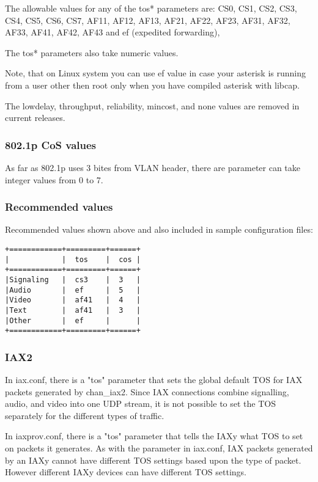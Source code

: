 The allowable values for any of the tos* parameters are: 
CS0, CS1, CS2, CS3, CS4, CS5, CS6, CS7, AF11, AF12, AF13, AF21, AF22, AF23, 
AF31, AF32, AF33, AF41, AF42, AF43 and ef (expedited forwarding),

The tos* parameters also take numeric values.

Note, that on Linux system you can use ef value in case your asterisk is running
from a user other then root only when you have compiled asterisk with libcap.

The lowdelay, throughput, reliability, mincost, and none values are removed
in current releases.

\subsubsection{802.1p CoS values}

As far as 802.1p uses 3 bites from VLAN header, there are parameter can take
integer values from 0 to 7.

\subsubsection{Recommended values}
Recommended values shown above and also included in sample configuration files:
\begin{verbatim}
+============+=========+======+
|            |  tos    |  cos |
+============+=========+======+
|Signaling   |  cs3    |  3   |
|Audio       |  ef     |  5   |
|Video       |  af41   |  4   |
|Text        |  af41   |  3   |
|Other       |  ef     |      |
+============+=========+======+
\end{verbatim}

\subsubsection{IAX2}

In iax.conf, there is a "tos" parameter that sets the global default TOS
for IAX packets generated by chan\_iax2.  Since IAX connections combine
signalling, audio, and video into one UDP stream, it is not possible
to set the TOS separately for the different types of traffic.

In iaxprov.conf, there is a "tos" parameter that tells the IAXy what TOS
to set on packets it generates.  As with the parameter in iax.conf,
IAX packets generated by an IAXy cannot have different TOS settings
based upon the type of packet.  However different IAXy devices can
have different TOS settings.

